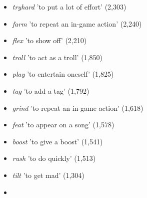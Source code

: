 \documentclass[output=paper]{langscibook}
\begin{document}
\begin{itemize}
\begin{styleListParagraph}
\textit{pack} 'to obtain as part of a pack' (2,344)
\end{styleListParagraph}
\item \begin{styleListParagraph}
\textit{tryhard} 'to put a lot of effort' (2,303)
\end{styleListParagraph}
\item \begin{styleListParagraph}
\textit{farm} 'to repeat an in-game action' (2,240)
\end{styleListParagraph}
\item \begin{styleListParagraph}
\textit{flex} 'to show off' (2,210)
\end{styleListParagraph}
\item \begin{styleListParagraph}
\textit{troll} 'to act as a troll' (1,850)
\end{styleListParagraph}
\item \begin{styleListParagraph}
\textit{play} 'to entertain oneself' (1,825)
\end{styleListParagraph}
\item \begin{styleListParagraph}
\textit{tag} {}'to add a tag' (1,792)
\end{styleListParagraph}
\item \begin{styleListParagraph}
\textit{grind} 'to repeat an in-game action' (1,618)
\end{styleListParagraph}
\item \begin{styleListParagraph}
\textit{feat} 'to appear on a song' (1,578)
\end{styleListParagraph}
\item \begin{styleListParagraph}
\textit{boost} 'to give a boost' (1,541)
\end{styleListParagraph}
\item \begin{styleListParagraph}
\textit{rush} 'to do quickly' (1,513)
\end{styleListParagraph}
\item \begin{styleListParagraph}
\textit{tilt} {}'to get mad' (1,304)
\end{styleListParagraph}
\item \begin{styleListParagraph}

\end{styleListParagraph}
\end{itemize}
\end{document}
